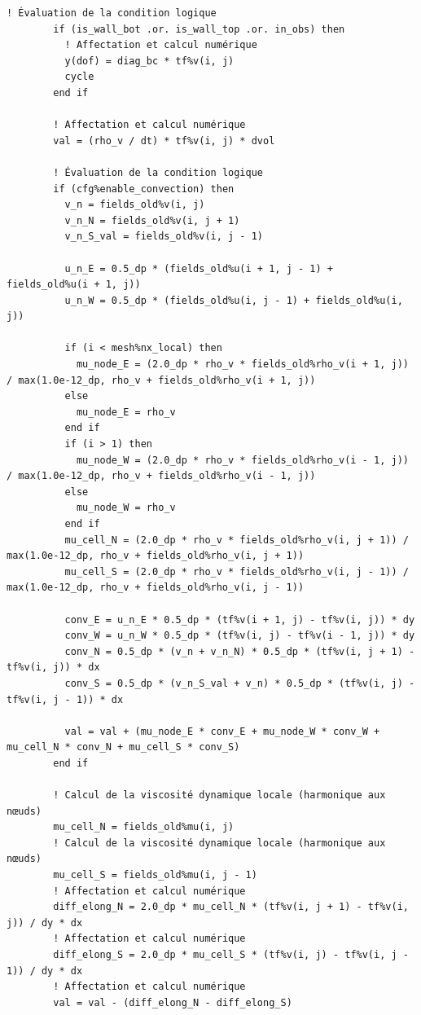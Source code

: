 \documentclass[10pt,a4paper,oneside]{book}
\begin{document}
\begin{lstlisting}[language={[95]Fortran}]
        ! Évaluation de la condition logique
        if (is_wall_bot .or. is_wall_top .or. in_obs) then
          ! Affectation et calcul numérique
          y(dof) = diag_bc * tf%v(i, j)
          cycle
        end if

        ! Affectation et calcul numérique
        val = (rho_v / dt) * tf%v(i, j) * dvol

        ! Évaluation de la condition logique
        if (cfg%enable_convection) then
          v_n = fields_old%v(i, j)
          v_n_N = fields_old%v(i, j + 1)
          v_n_S_val = fields_old%v(i, j - 1)

          u_n_E = 0.5_dp * (fields_old%u(i + 1, j - 1) + fields_old%u(i + 1, j))
          u_n_W = 0.5_dp * (fields_old%u(i, j - 1) + fields_old%u(i, j))

          if (i < mesh%nx_local) then
            mu_node_E = (2.0_dp * rho_v * fields_old%rho_v(i + 1, j)) / max(1.0e-12_dp, rho_v + fields_old%rho_v(i + 1, j))
          else
            mu_node_E = rho_v
          end if
          if (i > 1) then
            mu_node_W = (2.0_dp * rho_v * fields_old%rho_v(i - 1, j)) / max(1.0e-12_dp, rho_v + fields_old%rho_v(i - 1, j))
          else
            mu_node_W = rho_v
          end if
          mu_cell_N = (2.0_dp * rho_v * fields_old%rho_v(i, j + 1)) / max(1.0e-12_dp, rho_v + fields_old%rho_v(i, j + 1))
          mu_cell_S = (2.0_dp * rho_v * fields_old%rho_v(i, j - 1)) / max(1.0e-12_dp, rho_v + fields_old%rho_v(i, j - 1))

          conv_E = u_n_E * 0.5_dp * (tf%v(i + 1, j) - tf%v(i, j)) * dy
          conv_W = u_n_W * 0.5_dp * (tf%v(i, j) - tf%v(i - 1, j)) * dy
          conv_N = 0.5_dp * (v_n + v_n_N) * 0.5_dp * (tf%v(i, j + 1) - tf%v(i, j)) * dx
          conv_S = 0.5_dp * (v_n_S_val + v_n) * 0.5_dp * (tf%v(i, j) - tf%v(i, j - 1)) * dx

          val = val + (mu_node_E * conv_E + mu_node_W * conv_W + mu_cell_N * conv_N + mu_cell_S * conv_S)
        end if

        ! Calcul de la viscosité dynamique locale (harmonique aux nœuds)
        mu_cell_N = fields_old%mu(i, j)
        ! Calcul de la viscosité dynamique locale (harmonique aux nœuds)
        mu_cell_S = fields_old%mu(i, j - 1)
        ! Affectation et calcul numérique
        diff_elong_N = 2.0_dp * mu_cell_N * (tf%v(i, j + 1) - tf%v(i, j)) / dy * dx
        ! Affectation et calcul numérique
        diff_elong_S = 2.0_dp * mu_cell_S * (tf%v(i, j) - tf%v(i, j - 1)) / dy * dx
        ! Affectation et calcul numérique
        val = val - (diff_elong_N - diff_elong_S)


\end{lstlisting}
\end{document}
